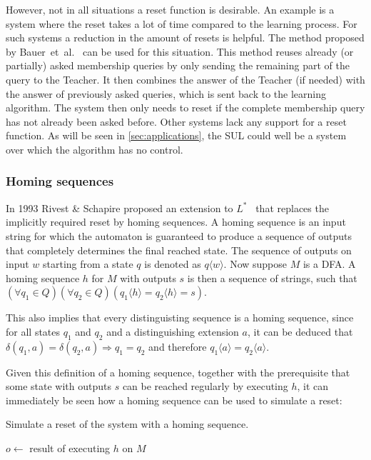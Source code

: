 However, not in all situations a reset function is desirable. An example is a
system where the reset takes a lot of time compared to the learning process. For
such systems a reduction in the amount of resets is helpful. The method proposed
by Bauer~et~al.~\cite{Bauer2012} can be used for this situation. This method
reuses already (or partially) asked membership queries by only sending the
remaining part of the query to the Teacher. It then combines the answer of the
Teacher (if needed) with the answer of previously asked queries, which is sent
back to the learning algorithm. The system then only needs to reset if the
complete membership query has not already been asked before. Other systems lack
any support for a reset function. As will be seen in \cref{sec:applications},
the SUL could well be a system over which the algorithm has no control.


\subsubsection{Homing sequences}
In 1993 Rivest \& Schapire proposed an extension to $L^*$~\cite[p. 312]{Rivest1993}
that replaces the implicitly required reset by homing sequences.
A homing sequence is an input string for which the automaton is guaranteed to
produce a sequence of outputs that completely determines the final reached state.
The sequence of outputs on input $w$ starting from a state $q$ is denoted as
$q \langle w \rangle$.
Now suppose $M$ is a DFA. A homing sequence $h$ for $M$ with outputs $s$ is then
a sequence of strings, such that $(\forall{q_1 \in Q})(\forall{q_2 \in Q})
(q_1 \langle h \rangle = q_2 \langle h \rangle = s)$.

This also implies that every distinguisting sequence is a homing sequence,
since for all states $q_1$ and $q_2$ and a distinguishing extension $a$,
it can be deduced that $\delta(q_1, a) = \delta(q_2, a) \Rightarrow q_1 = q_2$
and therefore $q_1 \langle a \rangle = q_2 \langle a \rangle$.

Given this definition of a homing sequence, together with the prerequisite
that some state with outputs $s$ can be reached regularly by executing $h$,
it can immediately be seen how a homing sequence can be used to simulate a reset:
\begin{algorithm}[hb]
  \caption{Simulate a reset of the system with a homing sequence.}
  \label{alg:reset-homing}
  \begin{algorithmic}[1]
     
      \Do
        \State $o \gets $ result of executing $h$ on $M$
    \EndFunction{}
  \end{algorithmic}
\end{algorithm}

